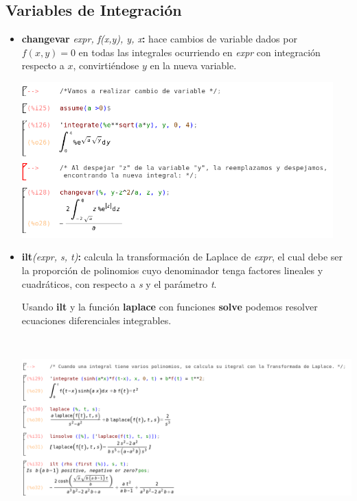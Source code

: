 \documentclass{article}
\begin{document}
\subsection{Variables de Integración}

\begin{itemize}
\item \textbf{changevar} \textit{expr, f(x,y), y, x}\textbf{:} hace cambios de variable dados por $f(x,y) = 0$ en todas las integrales ocurriendo en \textit{expr} con integración respecto a $x$, convirtiéndose $y$ en la nueva variable. 

	\begin{center}
    \includegraphics[height=6cm]{cambiodevar.png}
    \end{center}


\item \textbf{ilt}\textit{(expr, s, t)}\textbf{:} calcula la transformación de Laplace de \textit{expr}, el cual debe ser la proporción de polinomios cuyo denominador tenga factores lineales y cuadráticos, con respecto a \textit{s} y el parámetro \textit{t}. 

Usando \textbf{ilt} y la función \textbf{laplace} con funciones \textbf{solve} podemos resolver ecuaciones diferenciales integrables.

	\begin{center}
    \includegraphics[height=7cm]{Laplace.png}
    \end{center}


\end{itemize}
\end{document}
